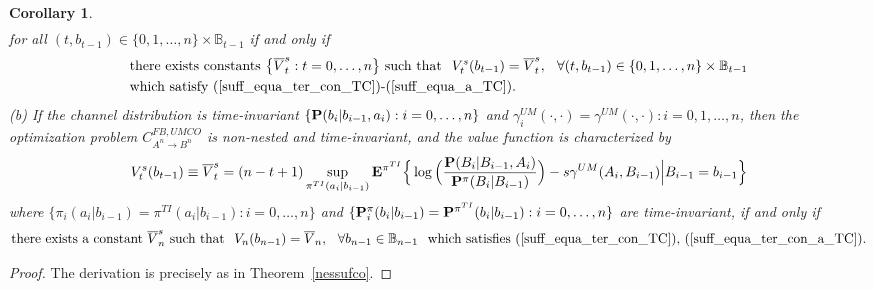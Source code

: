 \documentclass[11pt, a4paper, journal,onecolumn]{IEEEtran}
\newcommand{\mb}{\mathbb}
\newcommand{\rar}{\rightarrow}
\newcommand{\hso}{\hspace{.1in}}
\newtheorem{corollary}{Corollary}[section]
\begin{document}
\begin{corollary}
\begin{align}
\end{align}
for all $(t, b_{t-1})\in \{0, 1, \ldots, n\} \times {\mb B}_{t-1}$ if and only if 
\begin{align}
&\mbox{there exists  constants $\big\{\overline{V}_t^s: t=0, \ldots, n\big\}$ such that}   \hso V_t^s(b_{t-1})=\overline{V}_t^s,\hso  \forall (t,  b_{t-1}) \in  \{0,1,\ldots, n\} \times  {\mb B}_{t-1}  \nonumber \\
& \mbox{which satisfy (\ref{suff_equa_ter_con_TC})-(\ref{suff_equa_a_TC})}. \label{ST_D1}
\end{align} 
(b) If the channel distribution is time-invariant   $\{{\bf P}(b_i|b_{i-1},a_i): i=0, \ldots, n\}$ and $\gamma_i^{UM}(\cdot,\cdot)=\gamma^{UM}(\cdot,\cdot):i=0,1,\ldots,n$, then 
the optimization problem  $C_{A^n \rar B^n}^{FB,UMCO}$ is non-nested and time-invariant, and the value function is  characterized by  
\begin{align}
V_t^s(b_{t-1})\equiv \overline{V}_t^s= (n-t+1)\sup_{\pi^{TI}(a_i|b_{i-1})}{\bf E}^{\pi^{TI}}\Big\{\log\Big(\frac{{\bf P}(B_i|B_{i-1},A_i)}{{\bf P}^\pi(B_i|B_{i-1})}\Big)-s \gamma^{UM}(A_i, B_{i-1})\Big|B_{i-1}=b_{i-1}\Big\} \label{dyn_TC_NN_SS}
\end{align}
where $\{\pi_i(a_i|b_{i-1})= \pi^{TI}(a_i|b_{i-1}): i=0, \ldots, n\}$ and $\{{\bf  P}_i^{\pi}(b_i|b_{i-1})= {\bf P}^{\pi^{TI}}(b_i|b_{i-1}): i=0, \ldots, n\}$ are time-invariant,   if and only if 
 \begin{align}
\mbox{there exists a constant $\overline{V}_n^s$ such that}   \hso V_n(b_{n-1})=\overline{V}_n,\hso  \forall b_{n-1} \in  {\mb B}_{n-1}  \hso \mbox{which satisfies (\ref{suff_equa_ter_con_TC}), (\ref{suff_equa_ter_con_a_TC})}. \label{ST_D_TI1}
\end{align} 
\end{corollary}
\begin{proof} The derivation is precisely as in Theorem~\ref{nessufco}.
\end{proof}
\end{document}
